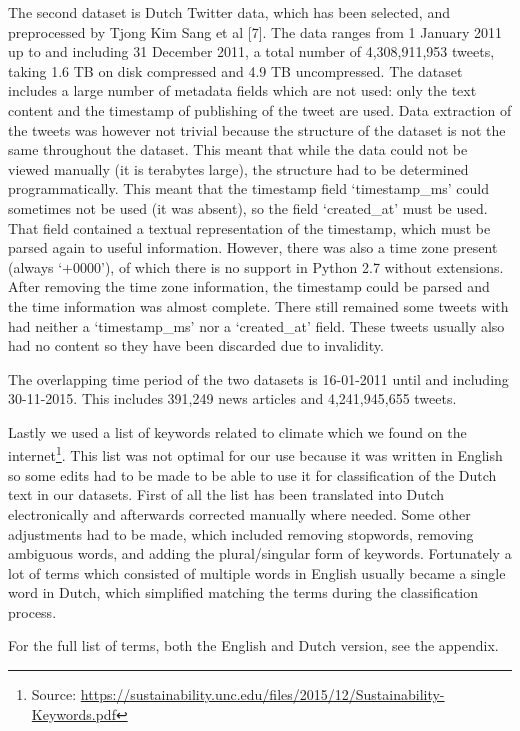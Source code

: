\documentclass[paper=a4, fontsize=9px]{scrartcl} %
\numberwithin{equation}{section} %
\numberwithin{figure}{section} %
\numberwithin{table}{section} %
\begin{document}
\begin{multicols}{2}
The second dataset is Dutch Twitter data, which has been selected, and preprocessed by Tjong Kim Sang et al [7]. The data ranges from 1 January 2011 up to and including 31 December 2011, a total number of 4,308,911,953 tweets, taking 1.6 TB on disk compressed and 4.9 TB uncompressed. The dataset includes a large number of metadata fields which are not used: only the text content and the timestamp of publishing of the tweet are used. Data extraction of the tweets was however not trivial because the structure of the dataset is not the same throughout the dataset. This meant that while the data could not be viewed manually (it is terabytes large), the structure had to be determined programmatically. This meant that the timestamp field `timestamp\_ms’ could sometimes not be used (it was absent), so the field `created\_at’ must be used. That field contained a textual representation of the timestamp, which must be parsed again to useful information. However, there was also a time zone present (always `+0000’), of which there is no support in Python 2.7 without extensions. After removing the time zone information, the timestamp could be parsed and the time information was almost complete. There still remained some tweets with had neither a `timestamp\_ms’ nor a `created\_at’ field. These tweets usually also had no content so they have been discarded due to invalidity. 

The overlapping time period of the two datasets is 16-01-2011 until and including 30-11-2015. This includes 391,249 news articles and 4,241,945,655 tweets.

Lastly we used a list of keywords related to climate which we found on the internet\footnote{Source: \url{https://sustainability.unc.edu/files/2015/12/Sustainability-Keywords.pdf}}. This list was not optimal for our use because it was written in English so some edits had to be made to be able to use it for classification of the Dutch text in our datasets. First of all the list has been translated into Dutch electronically and afterwards corrected manually where needed. Some other adjustments had to be made, which included removing stopwords, removing ambiguous words, and adding the plural/singular form of keywords. Fortunately a lot of terms which consisted of multiple words in English usually became a single word in Dutch, which simplified matching the terms during the classification process. 

For the full list of terms, both the English and Dutch version, see the appendix.


\end{multicols}
\end{document}
